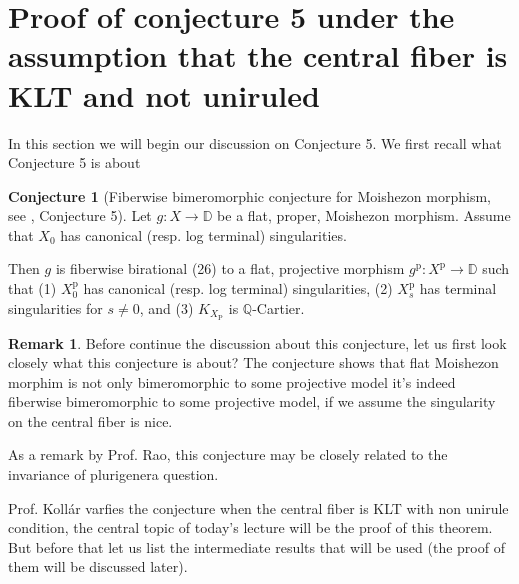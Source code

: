 \documentclass[11pt]{article}
\theoremstyle{definition}
\newtheorem{remark}[theorem]{Remark}
\newtheorem{conjecture}[theorem]{Conjecture}
\begin{document}
	\section{Proof of conjecture 5 under the assumption that the central fiber is KLT and not uniruled}
	In this section we will begin our discussion on Conjecture 5. We first recall what Conjecture 5 is about
	
	\begin{conjecture}[Fiberwise bimeromorphic conjecture for Moishezon morphism, see \cite{Moishezonmorphism}, Conjecture 5]
		Let $g: X \rightarrow \mathbb{D}$ be a flat, proper, Moishezon morphism. Assume that $X_0$ has canonical (resp. log terminal) singularities. 
		
		Then $g$ is fiberwise birational (26) to a flat, projective morphism $g^{\mathrm{p}}: X^{\mathrm{p}} \rightarrow \mathbb{D}$ such that
		(1) $X_0^{\mathrm{p}}$ has canonical (resp. log terminal) singularities,
		(2) $X_s^{\mathrm{p}}$ has terminal singularities for $s \neq 0$, and
		(3) $K_{X_{\mathrm{P}}}$ is $\mathbb{Q}$-Cartier.
	\end{conjecture}
	\begin{remark}
		Before continue the discussion about this conjecture, let us first look closely what this conjecture is about? The conjecture shows that flat Moishezon morphim is not only bimeromorphic to some projective model it's indeed fiberwise bimeromorphic to some projective model, if we assume the singularity on the central fiber is nice.
		
		As a remark by Prof. Rao, this conjecture may be closely related to the invariance of plurigenera question.
	\end{remark}
	
	Prof. Kollár varfies the conjecture when the central fiber is KLT with non unirule condition, the central topic of today's lecture will be the proof of this theorem. But before that let us list the intermediate results that will be used (the proof of them will be discussed later).
	
\end{document}
